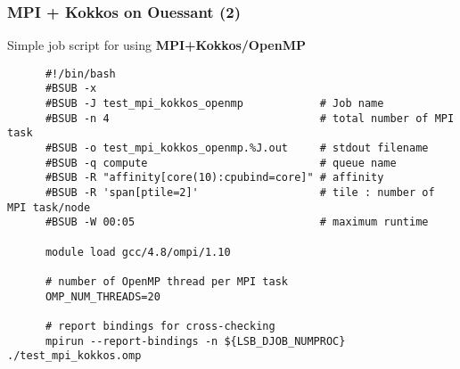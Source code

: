 \begin{frame}[fragile=singleslide]
  \frametitle{MPI + Kokkos on Ouessant (2)}

  {\Large Simple job script for using \textbf{MPI+Kokkos/OpenMP}}

  {\small
    \begin{verbatim}
      #!/bin/bash
      #BSUB -x
      #BSUB -J test_mpi_kokkos_openmp            # Job name
      #BSUB -n 4                                 # total number of MPI task
      #BSUB -o test_mpi_kokkos_openmp.%J.out     # stdout filename
      #BSUB -q compute                           # queue name
      #BSUB -R "affinity[core(10):cpubind=core]" # affinity
      #BSUB -R 'span[ptile=2]'                   # tile : number of MPI task/node
      #BSUB -W 00:05                             # maximum runtime
            
      module load gcc/4.8/ompi/1.10
      
      # number of OpenMP thread per MPI task
      OMP_NUM_THREADS=20
      
      # report bindings for cross-checking
      mpirun --report-bindings -n ${LSB_DJOB_NUMPROC} ./test_mpi_kokkos.omp
    \end{verbatim}
  }
\end{frame}

